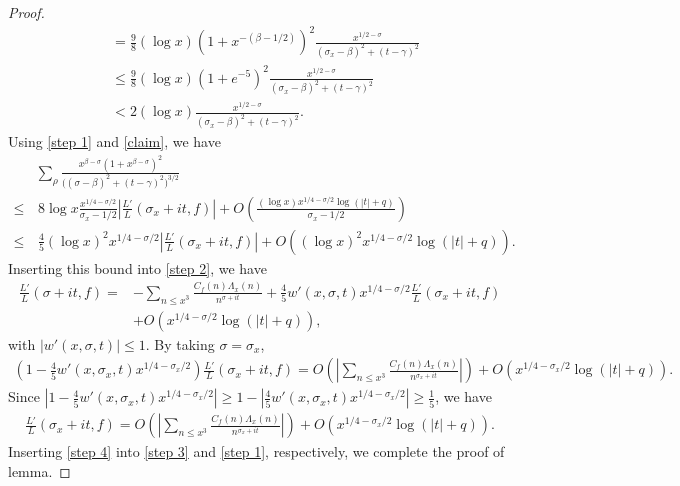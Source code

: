 \documentclass[11pt,reqno]{amsart}
\newcommand{\bea}{\begin{eqnarray}}
\newcommand{\eea}{\end{eqnarray}}
\numberwithin{equation}{section}
\theoremstyle{plain}
\theoremstyle{definition}
\begin{document}
\begin{proof}
\begin{equation*}
\begin{split}
&= \frac{9}{8}(\log x)(1+x^{-(\beta-1/2)})^2\frac{x^{1/2-\sigma}}
{(\sigma_x-\beta)^2+(t-\gamma)^2}\\
&\leq \frac{9}{8}(\log x)(1+e^{-5})^2\frac{x^{1/2-\sigma}}
{(\sigma_x-\beta)^2+(t-\gamma)^2}\\
&<2(\log x)\frac{x^{1/2-\sigma}}
{(\sigma_x-\beta)^2+(t-\gamma)^2}.
\end{split}
\end{equation*}
Using \eqref{step 1} and \eqref{claim}, we have
\begin{equation*}
\begin{split}
&\sum_\rho\frac{x^{\beta-\sigma}(1+x^{\beta-\sigma})^2}
{\big((\sigma-\beta)^2+(t-\gamma)^2\big)^{3/2}}\\
\leq&\,8\log x\frac{x^{1/4-\sigma/2}}{\sigma_x-1/2}\left|\frac{L'}{L}(\sigma_x+it,f)\right|
+O\left(\frac{(\log x)x^{1/4-\sigma/2}\log(|t|+q)}{\sigma_x-1/2}\right)\\
\leq&\,\frac{4}{5}(\log x)^2x^{1/4-\sigma/2}\left|\frac{L'}{L}(\sigma_x+it,f)\right|
+O\left((\log x)^2x^{1/4-\sigma/2}\log(|t|+q)\right).
\end{split}
\end{equation*}
Inserting this bound into \eqref{step 2}, we have
\begin{equation}\label{step 3}
\begin{split}
\frac{L'}{L}(\sigma+it,f)=&-\sum_{n\leq x^3} \frac{C_f(n)\Lambda_x(n)}{n^{\sigma+it}}
+\frac{4}{5}w'(x,\sigma,t)x^{1/4-\sigma/2}\frac{L'}{L}(\sigma_x+it,f)\\
&+O\left(x^{1/4-\sigma/2}\log(|t|+q)\right),
\end{split}
\end{equation}
with $|w'(x,\sigma,t)|\leq 1$.
By taking $\sigma=\sigma_x$,
\begin{equation*}
\begin{split}
\left(1-\frac{4}{5}w'(x,\sigma_x,t)x^{1/4-\sigma_x/2}\right)
\frac{L'}{L}(\sigma_x+it,f)
=O\left(\left|\sum_{n\leq x^3} \frac{C_f(n)\Lambda_x(n)}{n^{\sigma_x+it}}\right|\right)
+O\left(x^{1/4-\sigma_x/2}\log(|t|+q)\right).
\end{split}
\end{equation*}
Since $\left|1-\frac{4}{5}w'(x,\sigma_x,t)x^{1/4-\sigma_x/2}\right|
\geq 1-\left|\frac{4}{5}w'(x,\sigma_x,t)x^{1/4-\sigma_x/2}\right|\geq \frac{1}{5}$,
we have
\bea\label{step 4}
\frac{L'}{L}(\sigma_x+it,f)
=O\left(\left|\sum_{n\leq x^3} \frac{C_f(n)\Lambda_x(n)}{n^{\sigma_x+it}}\right|\right)
+O\left(x^{1/4-\sigma_x/2}\log(|t|+q)\right).
\eea
Inserting \eqref{step 4} into \eqref{step 3} and \eqref{step 1}, respectively, we complete the proof of lemma.
\end{proof}
\end{document}
